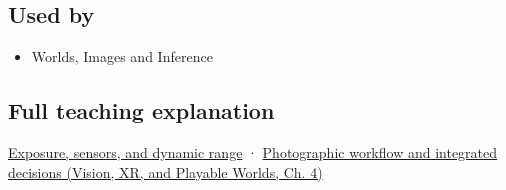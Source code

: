 \subsection{Used by}\label{appendix-92d45cdf2afc-used-by}

\begin{itemize}
\tightlist
\item
  {Worlds, Images and Inference}
\end{itemize}

\subsection{Full teaching explanation}\label{appendix-92d45cdf2afc-full-teaching-explanation}

\hyperref[03-visual-computing-i-ch003-exposure-sensors-and-dynamic-range]{Exposure, sensors, and dynamic range} · \href{../07-Vision-XR-and-Playable-Worlds/main.pdf\#nameddest=04-visual-computing-ii-ch034-photographic-workflow-and-integrated-decisions}{Photographic workflow and integrated decisions (Vision, XR, and Playable Worlds, Ch. 4)}

